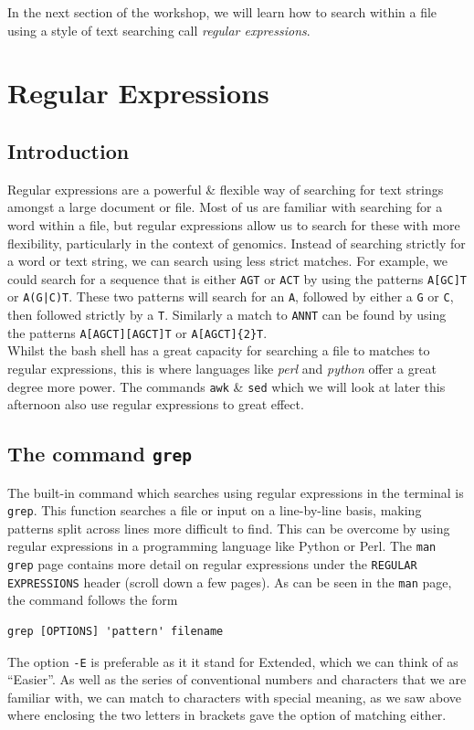 \documentclass[a4paper,12pt,twoside]{memoir}
\begin{document}
In the next section of the workshop, we will learn how to search within a file using a style of text searching call \textit{regular expressions}.

\chapter{Regular Expressions}
\section{Introduction}
Regular expressions are a powerful \& flexible way of searching for text strings amongst a large document or file.
Most of us are familiar with searching for a word within a file, but regular expressions allow us to search for these with more flexibility, particularly in the context of genomics.
Instead of searching strictly for a word or text string, we can search using less strict matches.
For example, we could search for a sequence that is either \texttt{AGT} or \texttt{ACT} by using the patterns  \texttt{A[GC]T} or  \texttt{A(G|C)T}.
These two patterns will search for an  \texttt{A}, followed by either a  \texttt{G} or  \texttt{C}, then followed strictly by a  \texttt{T}.
Similarly a match to \texttt{ANNT} can be found by using the patterns \texttt{A[AGCT][AGCT]T} or  \texttt{A[AGCT]\{2\}T}. \\

Whilst the bash shell has a great capacity for searching a file to matches to regular expressions, this is where languages like \textit{perl} and \textit{python} offer a great degree more power.
The commands \texttt{awk} \& \texttt{sed} which we will look at later this afternoon also use regular expressions to great effect.

\section{The command \texttt{grep}}
The built-in command which searches using regular expressions in the terminal is \texttt{grep}.
This function searches a file or input on a line-by-line basis, making patterns split across lines more difficult to find.
This can be overcome by using regular expressions in a programming language like Python or Perl.  
The \texttt{man grep} page contains more detail on regular expressions under the \texttt{REGULAR EXPRESSIONS} header (scroll down a few pages).  
As can be seen in the \texttt{man} page, the command follows the form
\begin{lstlisting}
grep [OPTIONS] 'pattern' filename
\end{lstlisting}
The option \texttt{-E} is preferable as it it stand for Extended, which we can think of as ``Easier''.
As well as the series of conventional numbers and characters that we are familiar with, we can match to characters with special meaning, as we saw above where enclosing the two letters in brackets gave the option of matching either. \\
\end{document}
